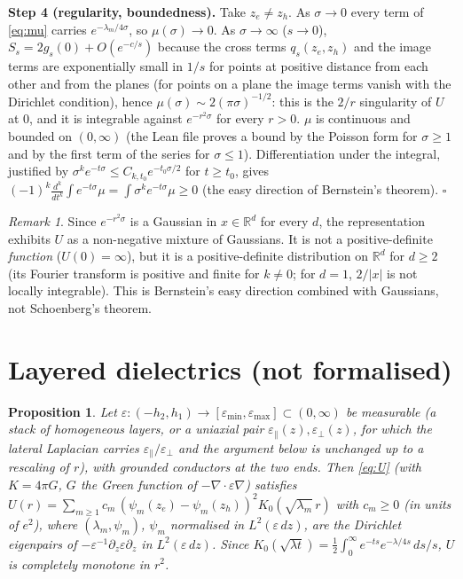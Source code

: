\documentclass[11pt,a4paper]{article}
\newtheorem{proposition}{Proposition}
\theoremstyle{remark}
\newtheorem{remark}{Remark}
\newcommand{\R}{\mathbb{R}}
\begin{document}
\textbf{Step 4 (regularity, boundedness).} Take $z_e\ne z_h$. As $\sigma\to0$ every term of \eqref{eq:mu} carries $e^{-\lambda_m/4\sigma}$, so
$\mu(\sigma)\to0$. As $\sigma\to\infty$ ($s\to0$), $S_s=2g_s(0)+O(e^{-c/s})$ because the cross terms $q_s(z_e,z_h)$ and the image terms are
exponentially small in $1/s$ for points at positive distance from each other and from the planes (for points on a plane the image terms
vanish with the Dirichlet condition), hence $\mu(\sigma)\sim 2(\pi\sigma)^{-1/2}$: this is the $2/r$ singularity of $U$ at $0$, and it is
integrable against $e^{-r^2\sigma}$ for every $r>0$. $\mu$ is continuous and bounded on $(0,\infty)$ (the Lean file proves a bound by the
Poisson form for $\sigma\ge1$ and by the first term of the series for $\sigma\le1$). Differentiation under the integral, justified by $\sigma^ke^{-t\sigma}\le C_{k,t_0}e^{-t_0\sigma/2}$ for
$t\ge t_0$, gives $(-1)^k\frac{d^k}{dt^k}\int e^{-t\sigma}\mu=\int\sigma^ke^{-t\sigma}\mu\ge0$ (the easy direction of Bernstein's theorem).
\hfill$\square$

\begin{remark}
Since $e^{-r^2\sigma}$ is a Gaussian in $x\in\R^d$ for every $d$, the representation exhibits $U$ as a non-negative mixture of Gaussians. It is
not a positive-definite \emph{function} ($U(0)=\infty$), but it is a positive-definite distribution on $\R^d$ for $d\ge2$ (its Fourier transform
is positive and finite for $k\ne0$; for $d=1$, $2/|x|$ is not locally integrable). This is Bernstein's easy direction combined with Gaussians,
not Schoenberg's theorem.
\end{remark}

\section{Layered dielectrics (not formalised)}\label{sec:diel}

\begin{proposition}\label{prop:diel}
Let $\varepsilon:(-h_2,h_1)\to[\varepsilon_{\min},\varepsilon_{\max}]\subset(0,\infty)$ be measurable (a stack of homogeneous layers, or a uniaxial pair $\varepsilon_\parallel(z),\varepsilon_\perp(z)$, for which the lateral Laplacian carries $\varepsilon_\parallel/\varepsilon_\perp$ and the argument below is unchanged up to a rescaling of $r$),
with grounded conductors at the two ends. Then \eqref{eq:U} (with $K=4\pi G$, $G$ the Green function of $-\nabla\!\cdot\varepsilon\nabla$) satisfies
$U(r)=\sum_{m\ge1}c_m\,(\psi_m(z_e)-\psi_m(z_h))^2K_0(\sqrt{\lambda_m}\,r)$ with $c_m\ge0$ (in units of $e^2$), where $(\lambda_m,\psi_m)$, $\psi_m$ normalised in $L^2(\varepsilon\,dz)$, are the Dirichlet
eigenpairs of $-\varepsilon^{-1}\partial_z\varepsilon\partial_z$ in $L^2(\varepsilon\,dz)$. Since $K_0(\sqrt{\lambda t})=\tfrac12\int_0^\infty
e^{-ts}e^{-\lambda/4s}\,ds/s$, $U$ is completely monotone in $r^2$.
\end{proposition}
\end{document}
